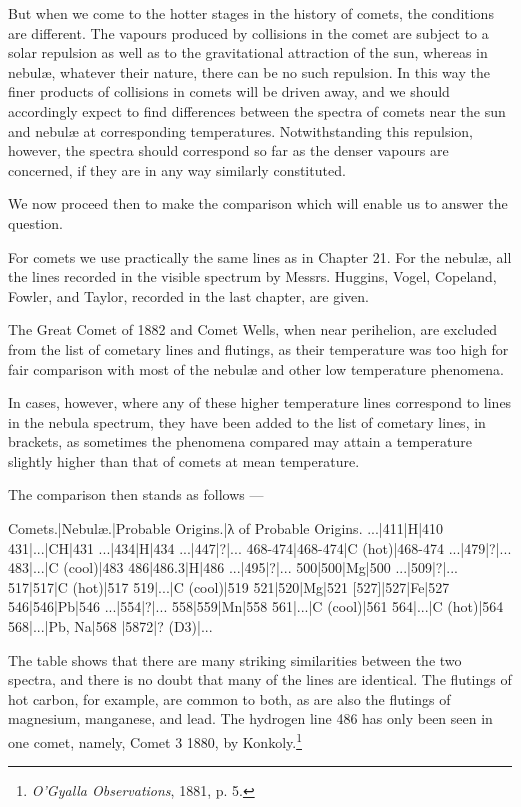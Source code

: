 \documentclass[a4paper, 12pt, oneside, polutonikogreek, english]{article}
\begin{document}
But when we come to the hotter stages in the history of comets, the conditions are different. The vapours produced by collisions in the comet are subject to a solar repulsion as well as to the gravitational attraction of the sun, whereas in nebulæ, whatever their nature, there can be no such repulsion. In this way the finer products of collisions in comets will be driven away, and we should accordingly expect to find differences between the spectra of comets near the sun and nebulæ at corresponding temperatures. Notwithstanding this repulsion, however, the spectra should correspond so far as the denser vapours are concerned, if they are in any way similarly constituted.

We now proceed then to make the comparison which will enable us to answer the question.

For comets we use practically the same lines as in Chapter 21. For the nebulæ, all the lines recorded in the visible spectrum by Messrs. Huggins, Vogel, Copeland, Fowler, and Taylor, recorded in the last chapter, are given.

The Great Comet of 1882 and Comet Wells, when near perihelion, are excluded from the list of cometary lines and flutings, as their temperature was too high for fair comparison with most of the nebulæ and other low temperature phenomena.

In cases, however, where any of these higher temperature lines correspond to lines in the nebula spectrum, they have been added to the list of cometary lines, in brackets, as sometimes the phenomena compared may attain a temperature slightly higher than that of comets at mean temperature.

The comparison then stands as follows ---

Comets.|Nebulæ.|Probable Origins.|λ of Probable Origins. 
...|411|H|410 
431|...|CH|431 
...|434|H|434 
...|447|?|... 
468-474|468-474|C (hot)|468-474 
...|479|?|... 
483|...|C (cool)|483 
486|486.3|H|486 
...|495|?|... 
500|500|Mg|500 
...|509|?|... 
517|517|C (hot)|517 
519|...|C (cool)|519 
521|520|Mg|521 
[527]|527|Fe|527 
546|546|Pb|546 
...|554|?|... 
558|559|Mn|558 
561|...|C (cool)|561 
564|...|C (hot)|564 
568|...|Pb, Na|568 
|5872|? (D3)|... 

The table shows that there are many striking similarities between the two spectra, and there is no doubt that many of the lines are identical. The flutings of hot carbon, for example, are common to both, as are also the flutings of magnesium, manganese, and lead. The hydrogen line 486 has only been seen in one comet, namely, Comet 3 1880, by Konkoly.\footnote{\emph{O'Gyalla Observations}, 1881, p. 5.}
\end{document}
